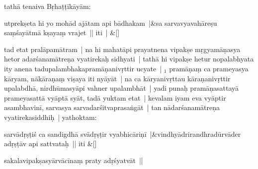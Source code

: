 \documentclass[article,12pt,a4paper]{memoir}%
\newcounter{parCount}
\begin{document}
	  
	  
	    \pstart  \leavevmode%
	    \hphantom{.}
	{}
	\pend%
      

	  
	  \pstart \leavevmode%
	\label{thakur75-42.21}tathā tenaiva Bṛhaṭṭīkāyām:
	{}
	\pend%
      
	    
	    \stanza[\smallbreak]
	  utprekṣeta hi yo mohād ajātam api bādhakam |&sa sarvavyavahāreṣu saṃśayātmā kṣayaṃ vrajet || iti | \&[\smallbreak]
	  
	  
	  

	  
	  \pstart \leavevmode%
	tad etat pralāpamātram | na hi mahatāpi prayatnena vipakṣe mṛgyamāṇasya hetor adarśanamātreṇa vyatirekaḥ sidhyati | tathā hi vipakṣe hetur nopalabhyata ity anena tadupalambhakapramāṇanivṛttir ucyate | {\tiny $_{1}$} pramāṇaṃ ca prameyasya kāryam, nākāraṇaṃ viṣaya iti nyāyāt | na ca kāryanivṛttau kāraṇanivṛttir upalabdhā, nirdhūmasyāpi vahner upalambhāt | yadi punaḥ pramāṇasattayā prameyasattā vyāptā syāt, tadā yuktam etat | kevalam iyam eva vyāptir asambhavinī, sarvasya sarvadarśitvaprasaṅgāt | tan nādarśanamātreṇa vyatirekasiddhiḥ | yathoktam: 
	    \pend%
	  
	    
	    \stanza[\smallbreak]
	  sarvādṛṣṭiś ca sandigdhā svādṛṣṭir vyabhicāriṇī |&vindhyādrirandhradūrvāder adṛṣṭāv api sattvataḥ || iti \&[\smallbreak]
	  
	  
	  
	    \pstart  \leavevmode%
	    \hphantom{.}
	   sakalavipakṣasyārvācīnaṃ praty adṛśyatvāt ||
	{}
	\pend%
      
\end{document}
